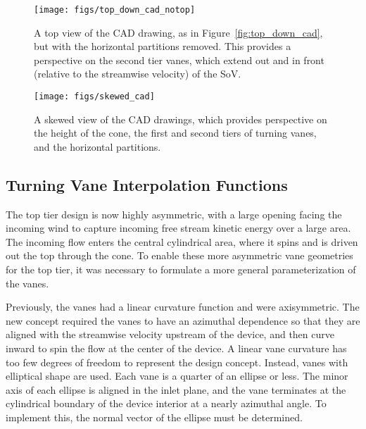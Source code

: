 \begin{figure}[!htb]
  \begin{center}
   \texttt{[image: figs/top\_down\_cad\_notop]}
   \caption{A top view of the CAD drawing, as in
   Figure~\ref{fig:top_down_cad}, but with the horizontal partitions
   removed. This provides a perspective on the second tier vanes, which
   extend out and in front (relative to the streamwise velocity) of the
   SoV.}
   \label{fig:top_down_cad_notop}
  \end{center}
 \end{figure}

\begin{figure}[!htb]
  \begin{center}
   \texttt{[image: figs/skewed\_cad]}
   \caption{A skewed view of the CAD drawings, which provides
   perspective on the height of the cone, the first and second tiers of 
   turning vanes, and the horizontal partitions.}
   \label{fig:cad_skewed}
  \end{center}
 \end{figure}

\subsection{Turning Vane Interpolation Functions}
\label{sec:interpolate}

The top tier design is now highly asymmetric, with a
large opening facing the incoming wind to capture incoming free stream
kinetic energy over a large area. The incoming flow enters the central
cylindrical area, where it spins and is driven out the top through the
cone. To enable these more asymmetric vane geometries for the top tier,
it was necessary to formulate a more general parameterization of the
vanes.

Previously, the vanes had a linear curvature function and were
axisymmetric. The new concept required the vanes to have an azimuthal
dependence so that they are aligned with the streamwise velocity upstream 
of the device, and then curve inward to spin the flow at the center of
the device. A linear vane curvature has
too few degrees of freedom to represent the design concept. 
Instead, vanes with elliptical shape are used. Each vane is a quarter of 
an ellipse or less. The minor axis of each ellipse is aligned in the inlet 
plane, and the vane terminates at the cylindrical boundary of the device interior 
at a nearly azimuthal angle. To implement this, the normal vector of the ellipse 
must be determined. 


